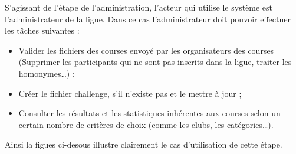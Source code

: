 S’agissant de l’étape de l’administration, l’acteur qui utilise le système est l’administrateur de la ligue. Dans ce cas l’administrateur doit pouvoir effectuer les tâches suivantes :
\begin{itemize} 
\item Valider les fichiers des courses envoyé par les organisateurs des courses (Supprimer les participants qui ne sont pas inscrits dans la ligue, traiter les homonymes…) ;
\item Créer le fichier challenge, s’il n’existe pas et le mettre à jour ;
\item  Consulter les résultats et les statistiques inhérentes aux courses selon un certain nombre de critères de choix (comme les clubs, les catégories…).
\end{itemize} 
Ainsi la figues ci-desous  illustre clairement le cas d’utilisation de cette étape.




